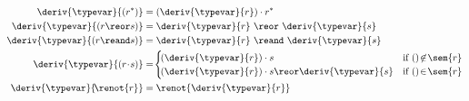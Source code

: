 





\newsavebox\boxa
\begin{lrbox}{\boxa}
  \begin{minipage}{0.4\textwidth}
\begin{align*}
  \deriv{\typevar}{(r^{*})}      &= (\deriv{\typevar}{r}) \cdot r^{*}\\
  \deriv{\typevar}{(r \reor s)}   &= \deriv{\typevar}{r} ~ \reor~ \deriv{\typevar}{s}\\
  \deriv{\typevar}{(r \reand s)} &= \deriv{\typevar}{r} ~ \reand~  \deriv{\typevar}{s}\\
  \deriv{\typevar}{(r\!\cdot\! s)} & =\! \begin{cases}
    \!(\deriv{\typevar}{r})\cdot s & \text{if $()\!\not\in\!\sem{r}$} \\
    \!(\deriv{\typevar}{r})\cdot s \reor \deriv{\typevar}{s} & \text{if $()\!\in\!\sem{r}$}
  \end{cases}\\
  \deriv{\typevar}{\!\renot{r}}  &= \renot{\deriv{\typevar}{r}}
\end{align*}
  \end{minipage}
\end{lrbox}



